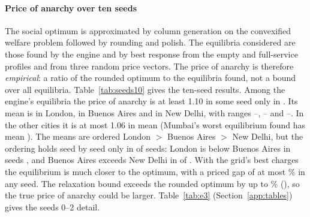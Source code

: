 \documentclass[preprint,11pt]{elsarticle}
\theoremstyle{definition}
\theoremstyle{remark}
\begin{document}
\paragraph{Price of anarchy over ten seeds} The social optimum is approximated by column generation on the convexified welfare problem followed by rounding and polish. The equilibria considered are those found by the engine and by best response from the empty and full-service profiles and from three random price vectors. The price of anarchy is therefore \emph{empirical}: a ratio of the rounded optimum to the equilibria found, not a bound over all equilibria. Table~\ref{tab:seeds10} gives the ten-seed results. Among the engine's equilibria the price of anarchy is at least 1.10 in some seed only in \TenPoaHiCities. Its mean is \TenPoaLondon{} in London, \TenPoaBuenosAires{} in Buenos Aires and \TenPoaNewDelhi{} in New Delhi, with ranges \TenPoaMinLondon--\TenPoaMaxLondon{}, \TenPoaMinBuenosAires--\TenPoaMaxBuenosAires{} and \TenPoaMinNewDelhi--\TenPoaMaxNewDelhi{}. In the other cities it is at most 1.06 in mean (Mumbai's worst equilibrium found has mean \TenMumbaiWorst). The means are ordered London $>$ Buenos Aires $>$ New Delhi, but the ordering holds seed by seed only in \TenPoaOrderAll{} of \TenPoaOrderN{} seeds: London is below Buenos Aires in seeds \TenPoaOrderFailSeeds, and Buenos Aires exceeds New Delhi in \TenPoaOrderBN{} of \TenPoaOrderN. With the grid's best charges the equilibrium is much closer to the optimum, with a priced gap of at most \TenPricedGapMax\% in any seed. The relaxation bound exceeds the rounded optimum by up to \SObound\% (\SOboundCity), so the true price of anarchy could be larger. Table~\ref{tab:e3} (Section~\ref{app:tables}) gives the seeds 0--2 detail.

\begin{table}[tbp]\centering\small
\caption{Ten-seed summary (exact oracle). $n_{\rm eq}$, $n_{\rm grid}$: seeds for the equilibrium quantities and for grid-derived quantities; $^*$: reduced exact grid, grid quantities are lower bounds. PoA of the engine's equilibrium, mean with bootstrap 95\% CI. Gains are \% of $|$social cost$|$ of the best exact grid point with the congestion charge only or the delivery charge only: mean (maximum over seeds). Delivery share: delivery-only gain over the combined gain per seed. Priced gap: shortfall of the equilibrium under the grid's best charges from the rounded optimum, \%.}\label{tab:seeds10}
\end{table}
\end{document}

